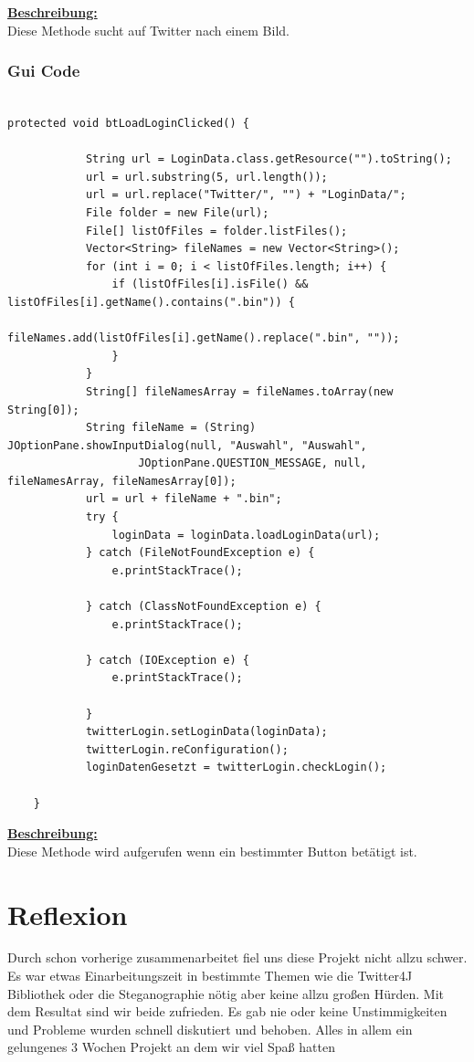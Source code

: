 \documentclass[11pt]{article}
\begin{document}
\underline{\textbf{Beschreibung:}}\\
Diese Methode sucht auf Twitter nach einem Bild.\\

\newpage
\subsubsection{Gui Code}

\begin{lstlisting}[frame=single]  % Start your code-block

protected void btLoadLoginClicked() {
			
			String url = LoginData.class.getResource("").toString();
			url = url.substring(5, url.length());
			url = url.replace("Twitter/", "") + "LoginData/";
			File folder = new File(url);
			File[] listOfFiles = folder.listFiles();
			Vector<String> fileNames = new Vector<String>();
			for (int i = 0; i < listOfFiles.length; i++) {
				if (listOfFiles[i].isFile() && listOfFiles[i].getName().contains(".bin")) {
					fileNames.add(listOfFiles[i].getName().replace(".bin", ""));
				}
			}
			String[] fileNamesArray = fileNames.toArray(new String[0]);
			String fileName = (String) JOptionPane.showInputDialog(null, "Auswahl", "Auswahl",
					JOptionPane.QUESTION_MESSAGE, null, fileNamesArray, fileNamesArray[0]);
			url = url + fileName + ".bin";
			try {
				loginData = loginData.loadLoginData(url);
			} catch (FileNotFoundException e) {
				e.printStackTrace();

			} catch (ClassNotFoundException e) {
				e.printStackTrace();

			} catch (IOException e) {
				e.printStackTrace();

			}
			twitterLogin.setLoginData(loginData);
			twitterLogin.reConfiguration();
			loginDatenGesetzt = twitterLogin.checkLogin();
	
	}

\end{lstlisting}

\underline{\textbf{Beschreibung:}}\\
Diese Methode wird aufgerufen wenn ein bestimmter Button betätigt ist.\\


\newpage
\section{Reflexion}

Durch schon vorherige zusammenarbeitet fiel uns diese Projekt nicht allzu schwer. Es war etwas Einarbeitungszeit in bestimmte Themen wie die Twitter4J Bibliothek oder die Steganographie nötig aber keine allzu großen Hürden. Mit dem Resultat sind wir beide zufrieden. Es gab nie oder keine Unstimmigkeiten und Probleme wurden schnell diskutiert und behoben. Alles in allem ein gelungenes 3 Wochen Projekt an dem wir viel Spaß hatten
\end{document}
